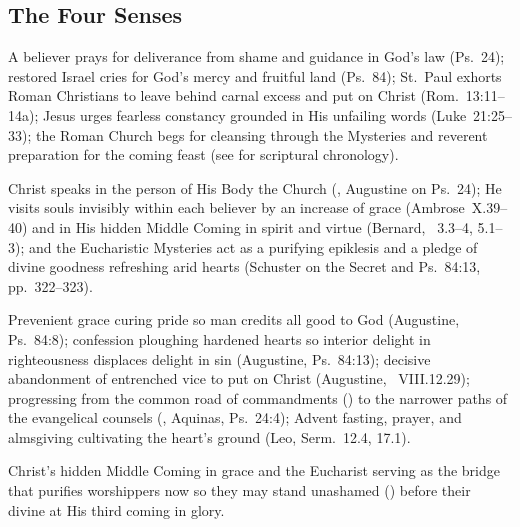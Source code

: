 \subsection{The Four Senses}

\begin{fourSenses}
\item[Literal.] A believer prays for deliverance from shame and guidance in God's law (Ps.~24); restored Israel cries for God's mercy and fruitful land (Ps.~84); St.~Paul exhorts Roman Christians to leave behind carnal excess and put on Christ (Rom.~13:11--14a); Jesus urges fearless constancy grounded in His unfailing words (Luke~21:25--33); the Roman Church begs for cleansing through the Mysteries and reverent preparation for the coming feast (see \hyperref[sec:date-location]{} for scriptural chronology).
\item[Allegorical.] Christ speaks in the person of His Body the Church (, Augustine on Ps.~24); He visits souls invisibly within each believer by an increase of grace (Ambrose~X.39--40) and in His hidden Middle Coming in spirit and virtue (Bernard, ~3.3--4, 5.1--3); and the Eucharistic Mysteries act as a purifying epiklesis and a pledge of divine goodness refreshing arid hearts (Schuster on the Secret and Ps.~84:13, pp.~322--323).
\item[Moral.] Prevenient grace curing pride so man credits all good to God (Augustine, Ps.~84:8); confession ploughing hardened hearts so interior delight in righteousness displaces delight in sin (Augustine, Ps.~84:13); decisive abandonment of entrenched vice to put on Christ (Augustine, ~VIII.12.29); progressing from the common road of commandments () to the narrower paths of the evangelical counsels (, Aquinas, Ps.~24:4); Advent fasting, prayer, and almsgiving cultivating the heart's ground (Leo, Serm.~12.4, 17.1).
\item[Anagogical.] Christ's hidden Middle Coming in grace and the Eucharist serving as the bridge that purifies worshippers now so they may stand unashamed () before their divine  at His third coming in glory.
\end{fourSenses}

